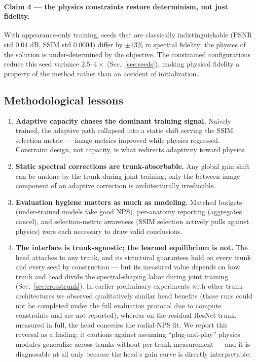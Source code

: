 \paragraph{Claim 4 --- the physics constraints restore determinism, not just fidelity.}
With appearance-only training, seeds that are classically indistinguishable (PSNR std 0.04 dB, SSIM std 0.0004) differ by $\pm 13\%$ in spectral fidelity: the physics of the solution is under-determined by the objective. The constrained configurations reduce this seed variance $2.5$--$4\times$ (Sec.~\ref{sec:seeds}), making physical fidelity a property of the method rather than an accident of initialization.

\subsection{Methodological lessons}
\label{sec:lessons}

\begin{enumerate}
  \item \textbf{Adaptive capacity chases the dominant training signal.} Naively trained, the adaptive path collapsed into a static shift serving the SSIM selection metric --- image metrics improved while physics regressed. Constraint design, not capacity, is what redirects adaptivity toward physics.
  \item \textbf{Static spectral corrections are trunk-absorbable.} Any global gain shift can be undone by the trunk during joint training; only the between-image component of an adaptive correction is architecturally irreducible.
  \item \textbf{Evaluation hygiene matters as much as modeling.} Matched budgets (under-trained models fake good NPS), per-anatomy reporting (aggregates cancel), and selection-metric awareness (SSIM selection actively pulls against physics) were each necessary to draw valid conclusions.
  \item \textbf{The interface is trunk-agnostic; the learned equilibrium is not.} The head attaches to any trunk, and its structural guarantees hold on every trunk and every seed by construction --- but its measured value depends on how trunk and head divide the spectral-shaping labor during joint training (Sec.~\ref{sec:crosstrunk}). In earlier preliminary experiments with other trunk architectures we observed qualitatively similar head benefits (those runs could not be completed under the full evaluation protocol due to compute constraints and are not reported), whereas on the residual ResNet trunk, measured in full, the head concedes the radial-NPS fit. We report this reversal as a finding: it cautions against assuming ``plug-and-play'' physics modules generalize across trunks without per-trunk measurement --- and it is diagnosable at all only because the head's gain curve is directly interpretable.
\end{enumerate}

